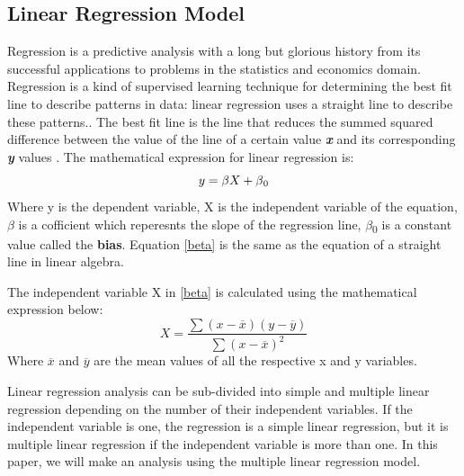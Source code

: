 \documentclass[conference]{IEEEtran}
\begin{document}
\subsection{Linear Regression Model}
Regression 
is a predictive analysis with a long but glorious history from its successful applications to problems in the statistics and economics domain. Regression is a kind of supervised learning technique for determining the best fit line to describe patterns in data: linear regression uses a straight line to describe these patterns.\cite{theobald2017machine}. The best fit line is the line that reduces the summed squared difference between the value of the line of a certain value \textbf{\textit{x}} and its corresponding \textbf{\textit{y}} values \cite{massaron2016regression}. The mathematical expression for linear regression is:
	\begin{equation}
		y = \beta\label{beta}X + \beta\textsubscript{0}
	\end{equation}
	Where y is the dependent variable, X is the independent variable of the equation, $\beta$ is a cofficient which reperesnts the slope of the regression line, $\beta$\textsubscript{0} is a constant value called the \textbf{bias}. Equation \eqref{beta} is the same as the equation of a straight line in linear algebra.
	
	The independent variable X in \eqref{beta} is calculated using the mathematical expression below:
	\begin{equation}
		X = \frac{\sum{}(x-\overline{x})(y-\overline{y})}{\sum{}(x-\overline{x})^2}
	\end{equation}	
	Where $\overline{x}$ and $\overline{y}$ are the mean values of all the respective x and y variables.
	
	
Linear regression analysis can be sub-divided into simple and multiple linear regression depending on the number of their independent variables. If the independent variable is one, the regression is a simple linear regression, but it is multiple linear regression if the independent variable is more than one. In this paper, we will make an analysis using the multiple linear regression model.
\end{document}
